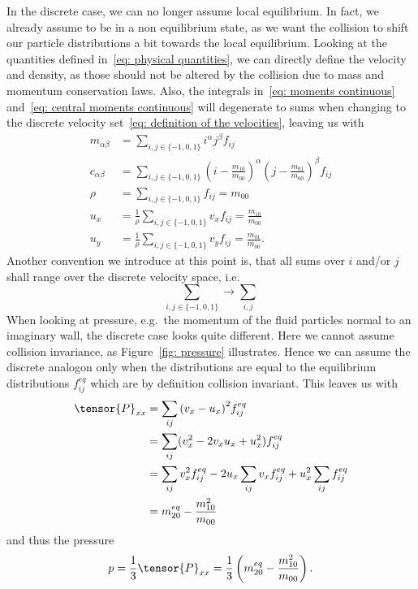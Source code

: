 In the discrete case, we can no longer assume local equilibrium.
In fact, we already assume to be in a non equilibrium state, as we want the collision to shift our particle distributions a bit towards the local equilibrium.
Looking at the quantities defined in~\eqref{eq: physical quantities}, we can directly define the velocity and density, as those should not be altered by the collision due to mass and momentum conservation laws.
Also, the integrals in~\eqref{eq: moments continuous} and~\eqref{eq: central moments continuous} will degenerate to sums when changing to the discrete velocity set~\eqref{eq: definition of the velocities}, leaving us with
\begin{align}
  m_{\alpha\beta} &= \sum_{i,j \in \{-1,0,1\}} i^\alpha j^\beta f_{ij}
  \label{eq: moment definition}\\
  c_{\alpha\beta} &= \sum_{i,j \in \{-1,0,1\}} {\left(i - \frac{m_{10}}{m_{00}}\right)}^\alpha {\left(j-\frac{m_{01}}{m_{00}}\right)}^\beta f_{ij}
  \label{eq: central moment definition}\\
  \rho & = \sum_{i,j \in \{-1,0,1\}} f_{ij} = m_{00}
  \label{eq: density definition}\\
  u_x  & = \frac{1}{\rho} \sum_{i,j \in \{-1,0,1\}} v_x f_{ij} = \frac{m_{10}}{m_{00}}
  \label{eq: x velocity definition}\\
  u_y  & = \frac{1}{\rho} \sum_{i,j \in \{-1,0,1\}} v_y f_{ij} = \frac{m_{01}}{m_{00}}.
  \label{eq: y velocity definition}
\end{align}
Another convention we introduce at this point is, that all sums over $i$ and/or $j$ shall range over the discrete velocity space, i.e.
\begin{equation*}
  \sum_{i,j \in \{-1,0,1\}} \rightarrow \sum_{i,j}
\end{equation*}
When looking at pressure, e.g.\ the momentum of the fluid particles normal to an imaginary wall, the discrete case looks quite different.
Here we cannot assume collision invariance, as Figure~\ref{fig: pressure} illustrates.
Hence we can assume the discrete analogon only when the distributions are equal to the equilibrium distributions $f_{ij}^{eq}$ which are by definition collision invariant.
This leaves us with
\begin{equation}
  \begin{aligned}
    \tensor{P}_{xx}
    & = \sum_{ij} {(v_x - u_x)}^2 f_{ij}^{eq}
    \\ & =
    \sum_{ij} (v_x^2 - 2v_x u_x + u_x^2) f_{ij}^{eq}
    \\ & =
    \sum_{ij} v_x^2 f_{ij}^{eq} - 2 u_x \sum_{ij} v_x f_{ij}^{eq} + u_x^2 \sum_{ij}f_{ij}^{eq}
    \\ & = m_{20}^{eq} - \frac{m_{10}^2}{m_{00}}
  \end{aligned}
\end{equation}
and thus the pressure
\begin{equation}
  p=\frac{1}{3} \tensor{P}_{xx} = \frac{1}{3} \left(m_{20}^{eq} - \frac{m_{10}^2}{m_{00}}\right).
\end{equation}

